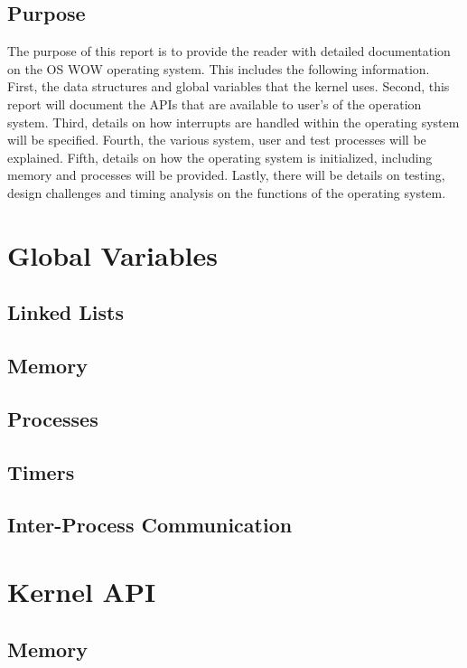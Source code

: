 \documentclass[se]{uw-wkrpt}
\begin{document}
\subsection{Purpose}

The purpose of this report is to provide the reader with detailed documentation on the OS WOW operating system. This includes the following information. First, the data structures and global variables that the kernel uses. Second, this report will document the APIs that are available to user's of the operation system. Third, details on how interrupts are handled within the operating system will be specified. Fourth, the various system, user and test processes will be explained. Fifth, details on how the operating system is initialized, including memory and processes will be provided. Lastly, there will be details on testing, design challenges and timing analysis on the functions of the operating system.

\section{Global Variables}\label{sec:global}

\subsection{Linked Lists}

\subsection{Memory}

\subsection{Processes}

\subsection{Timers}

\subsection{Inter-Process Communication}

\section{Kernel API}\label{sec:kernel}

\subsection{Memory}
\end{document}
